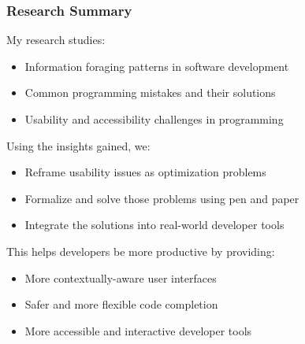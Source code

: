 \documentclass[mathserif,notheorems]{beamer}
\theoremstyle{plain} %
\theoremstyle{definition} %
\begin{document}
\begin{frame}
  \frametitle{Research Summary}
  My research studies:
  \begin{itemize}
  \item Information foraging patterns in software development
  \item Common programming mistakes and their solutions
  \item Usability and accessibility challenges in programming
  \end{itemize}\vspace{10pt}
  Using the insights gained, we:
  \begin{itemize}
  \item Reframe usability issues as optimization problems
  \item Formalize and solve those problems using pen and paper
  \item Integrate the solutions into real-world developer tools
  \end{itemize}\vspace{10pt}
  This helps developers be more productive by providing:
  \begin{itemize}
  \item More contextually-aware user interfaces
  \item Safer and more flexible code completion
  \item More accessible and interactive developer tools
  \end{itemize}
\end{frame}
\end{document}
